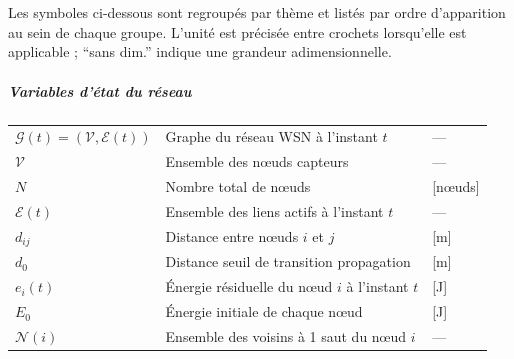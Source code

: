 

\chapter*{\nomname}
\pagestyle{pagenumber}

\noindent
Les symboles ci-dessous sont regroupés par thème et listés par ordre d'apparition au sein de chaque groupe. L'unité est précisée entre crochets lorsqu'elle est applicable ; ``sans dim.'' indique une grandeur adimensionnelle.

\bigskip

\paragraph{Variables d'état du réseau}
\begin{longtable}{lp{3in}l}
$\mathcal{G}(t)=(\mathcal{V},\mathcal{E}(t))$ & Graphe du réseau WSN à l'instant $t$ & --- \\
$\mathcal{V}$ & Ensemble des nœuds capteurs & --- \\
$N$ & Nombre total de nœuds & [nœuds] \\
$\mathcal{E}(t)$ & Ensemble des liens actifs à l'instant $t$ & --- \\
$d_{ij}$ & Distance entre nœuds $i$ et $j$ & [m] \\
$d_0$ & Distance seuil de transition propagation & [m] \\
$e_i(t)$ & Énergie résiduelle du nœud $i$ à l'instant $t$ & [J] \\
$E_0$ & Énergie initiale de chaque nœud & [J] \\
$\mathcal{N}(i)$ & Ensemble des voisins à 1 saut du nœud $i$ & --- \\
\end{longtable}

